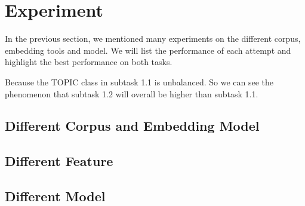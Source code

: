 \section{Experiment}

In the previous section, we mentioned many experiments on the different corpus, embedding tools and model. We will list the performance of each attempt and highlight the best performance on both tasks.

Because the TOPIC class in subtask 1.1 is unbalanced. So we can see the phenomenon that subtask 1.2 will overall be higher than subtask 1.1.

\subsection{Different Corpus and Embedding Model}



\subsection{Different Feature}



\subsection{Different Model}


